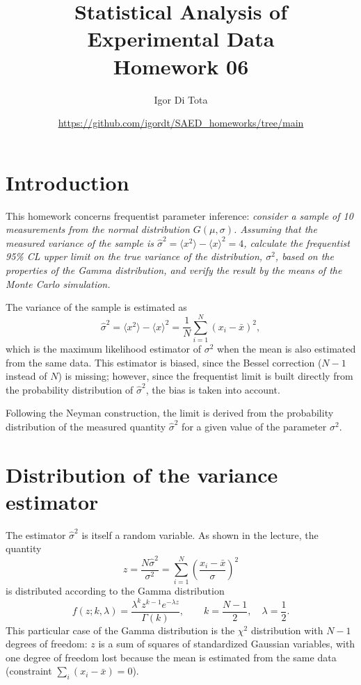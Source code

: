 \documentclass[11pt,a4paper]{article}
\title{Statistical Analysis of Experimental Data\\
	\vspace{0.2cm}
	\large{Homework 06}}
\author{Igor Di Tota}
\date{\small \url{https://github.com/igordt/SAED_homeworks/tree/main}}
\begin{document}
	
	\maketitle
	
	\section*{Introduction}

	This homework concerns frequentist parameter inference: \textit{consider a sample of 10 measurements from the normal distribution $G(\mu, \sigma)$. Assuming that the measured variance of the sample is $\hat\sigma^2 = \langle x^2 \rangle - \langle x \rangle^2 = 4$, calculate the frequentist 95\% CL upper limit on the true variance of the distribution, $\sigma^2$, based on the properties of the Gamma distribution, and verify the result by the means of the Monte Carlo simulation.}

	The variance of the sample is estimated as
	\begin{equation}
		\hat\sigma^2 = \langle x^2 \rangle - \langle x \rangle^2 = \frac{1}{N}\sum_{i=1}^{N} (x_i - \bar{x})^2 ,
	\end{equation}
	which is the maximum likelihood estimator of $\sigma^2$ when the mean is also estimated from the same data.
	This estimator is biased, since the Bessel correction ($N-1$ instead of $N$) is missing; however, since the frequentist limit is built directly from the probability distribution of $\hat\sigma^2$, the bias is taken into account.

	Following the Neyman construction, the limit is derived from the probability distribution of the measured quantity $\hat\sigma^2$ for a given value of the parameter $\sigma^2$.

	\section*{Distribution of the variance estimator}

	The estimator $\hat\sigma^2$ is itself a random variable.
	As shown in the lecture, the quantity
	\begin{equation}
		z = \frac{N \hat\sigma^2}{\sigma^2} = \sum_{i=1}^{N} \left(\frac{x_i - \bar{x}}{\sigma}\right)^2
	\end{equation}
	is distributed according to the Gamma distribution
	\begin{equation}
		f(z; k, \lambda) = \frac{\lambda^k z^{k-1} e^{-\lambda z}}{\Gamma(k)}, \qquad k = \frac{N-1}{2}, \quad \lambda = \frac{1}{2}.
	\end{equation}
	This particular case of the Gamma distribution is the $\chi^2$ distribution with $N-1$ degrees of freedom: $z$ is a sum of squares of standardized Gaussian variables, with one degree of freedom lost because the mean is estimated from the same data (constraint $\sum_i (x_i - \bar{x}) = 0$).
	
\end{document}
